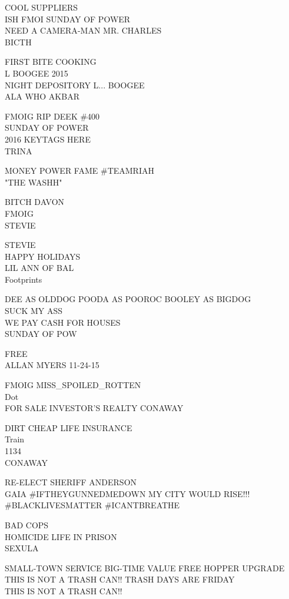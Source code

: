 \documentclass[10pt,letterpaper]{article}
\begin{document}
COOL SUPPLIERS\\
ISH FMOI SUNDAY OF POWER\\
NEED A CAMERA{-}MAN MR. CHARLES\\
BICTH

FIRST BITE COOKING\\
L BOOGEE 2015\\
NIGHT DEPOSITORY L... BOOGEE\\
ALA WHO AKBAR

FMOIG RIP DEEK \#400\\
SUNDAY OF POWER\\
2016 KEYTAGS HERE\\
TRINA

MONEY POWER FAME \#TEAMRIAH\\
"THE WASHH"

BITCH DAVON\\
FMOIG\\
STEVIE

STEVIE\\
HAPPY HOLIDAYS\\
LIL ANN OF BAL\\
Footprints

DEE AS OLDDOG POODA AS POOROC BOOLEY AS BIGDOG\\
SUCK MY ASS\\
WE PAY CASH FOR HOUSES\\
SUNDAY OF POW

FREE\\
ALLAN MYERS 11{-}24{-}15

FMOIG MISS\_SPOILED\_ROTTEN\\
Dot\\
FOR  SALE INVESTOR'S REALTY CONAWAY

DIRT CHEAP LIFE INSURANCE\\
Train\\
1134\\
CONAWAY

RE{-}ELECT SHERIFF ANDERSON\\
GAIA \#IFTHEYGUNNEDMEDOWN MY CITY WOULD RISE!!! \#BLACKLIVESMATTER \#ICANTBREATHE

BAD COPS\\
HOMICIDE LIFE IN PRISON\\
SEXULA

SMALL{-}TOWN SERVICE BIG{-}TIME VALUE FREE HOPPER UPGRADE\\
THIS IS NOT A TRASH CAN!!  TRASH DAYS ARE FRIDAY\\
THIS IS NOT A TRASH CAN!!
\end{document}
